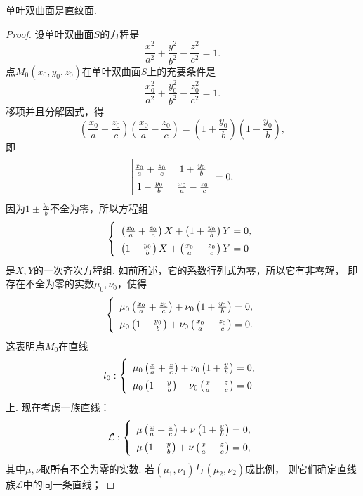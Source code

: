 \begin{theorem}
单叶双曲面是直纹面.
\begin{proof}
设单叶双曲面\(S\)的方程是\[
	\frac{x^2}{a^2}+\frac{y^2}{b^2}-\frac{z^2}{c^2}=1.
\]
点\(M_0(x_0,y_0,z_0)\)在单叶双曲面\(S\)上的充要条件是\[
	\frac{x_0^2}{a^2}+\frac{y_0^2}{b^2}-\frac{z_0^2}{c^2}=1.
\]
移项并且分解因式，得\[
	\left(\frac{x_0}{a}+\frac{z_0}{c}\right)
	\left(\frac{x_0}{a}-\frac{z_0}{c}\right)
	= \left(1+\frac{y_0}{b}\right)
	\left(1-\frac{y_0}{b}\right),
\]
即\[
	\def\arraystretch{1.5}
	\begin{vmatrix}
		\frac{x_0}{a}+\frac{z_0}{c} & 1+\frac{y_0}{b} \\
		1-\frac{y_0}{b} & \frac{x_0}{a}-\frac{z_0}{c}
	\end{vmatrix} = 0.
\]
因为\(1\pm\frac{y_0}{b}\)不全为零，所以方程组\[
	\left\{ \def\arraystretch{1.5} \begin{array}{l}
		\left(\frac{x_0}{a}+\frac{z_0}{c}\right) X
		+ \left(1+\frac{y_0}{b}\right) Y = 0, \\
		\left(1-\frac{y_0}{b}\right) X
		+ \left(\frac{x_0}{a}-\frac{z_0}{c}\right) Y = 0
	\end{array} \right.
\]
是\(X,Y\)的一次齐次方程组.
如前所述，它的系数行列式为零，所以它有非零解，
即存在不全为零的实数\(\mu_0,\nu_0\)，使得\[
	\left\{ \def\arraystretch{1.5} \begin{array}{l}
		\mu_0 \left(\frac{x_0}{a}+\frac{z_0}{c}\right)
		+ \nu_0 \left(1+\frac{y_0}{b}\right) = 0, \\
		\mu_0 \left(1-\frac{y_0}{b}\right)
		+ \nu_0 \left(\frac{x_0}{a}-\frac{z_0}{c}\right) = 0.
	\end{array} \right.
\]
这表明点\(M_0\)在直线\[
	l_0: \left\{ \def\arraystretch{1.5} \begin{array}{l}
		\mu_0 \left(\frac{x}{a}+\frac{z}{c}\right)
		+ \nu_0 \left(1+\frac{y}{b}\right) = 0, \\
		\mu_0 \left(1-\frac{y}{b}\right)
		+ \nu_0 \left(\frac{x}{a}-\frac{z}{c}\right) = 0
	\end{array} \right.
\]上.
现在考虑一族直线：\[
	\mathcal{L}:
	\left\{ \def\arraystretch{1.5} \begin{array}{l}
		\mu \left(\frac{x}{a}+\frac{z}{c}\right)
		+ \nu \left(1+\frac{y}{b}\right) = 0, \\
		\mu \left(1-\frac{y}{b}\right)
		+ \nu \left(\frac{x}{a}-\frac{z}{c}\right) = 0,
	\end{array} \right.
\]
其中\(\mu,\nu\)取所有不全为零的实数.
若\((\mu_1,\nu_1)\)与\((\mu_2,\nu_2)\)成比例，
则它们确定直线族\(\mathcal{L}\)中的同一条直线；

\end{proof}
\end{theorem}
